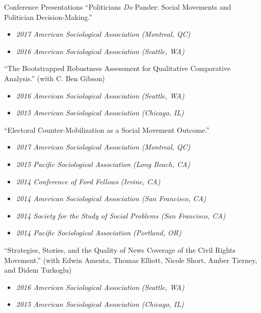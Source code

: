 \documentclass{resume} %
\begin{document}
\begin{rSection}{Conference Presentations}
``Politicians \textit{Do} Pander: Social Movements and Politician Decision-Making.''
\vspace*{-.75em} 
\begin{itemize}[leftmargin=.25in] 
\item {\footnotesize \it 2017 American Sociological Association (Montreal, QC)}\vspace*{-.75em} 
\item {\footnotesize \it 2016 American Sociological Association (Seattle, WA)}
\end{itemize} 

``The Bootstrapped Robustness Assessment for Qualitative Comparative Analysis.'' ({\footnotesize with C. Ben Gibson})
\vspace*{-.75em} 
\begin{itemize}[leftmargin=.25in] 
\item {\footnotesize \it 2016 American Sociological Association (Seattle, WA)}\vspace*{-.75em} 
\item {\footnotesize \it 2015 American Sociological Association (Chicago, IL)}
\end{itemize} 

``Electoral Counter-Mobilization as a Social Movement Outcome.''
\vspace*{-.75em} 
\begin{itemize}[leftmargin=.25in] 
\item {\footnotesize \it 2017 American Sociological Association (Montreal, QC)}\vspace*{-.75em} 
\item {\footnotesize \it 2015 Pacific Sociological Association (Long Beach, CA)}\vspace*{-.75em} 
\item {\footnotesize \it 2014 Conference of Ford Fellows (Irvine, CA)}\vspace*{-.75em} 
\item {\footnotesize \it 2014 American Sociological Association (San Francisco, CA)}\vspace*{-.75em} 
\item {\footnotesize \it 2014 Society for the Study of Social Problems (San Francisco, CA)}\vspace*{-.75em} 
\item {\footnotesize \it 2014 Pacific Sociological Association (Portland, OR)}
\end{itemize} 

``Strategies, Stories, and the Quality of News Coverage of the Civil Rights Movement.'' ({\footnotesize with Edwin Amenta, Thomas Elliott, Nicole Short, Amber Tierney, and Didem Turkoglu})
\vspace*{-.75em} 
\begin{itemize}[leftmargin=.25in] 
\item {\footnotesize \it 2016 American Sociological Association (Seattle, WA)}\vspace*{-.75em} 
\item {\footnotesize \it 2015 American Sociological Association (Chicago, IL)}
\end{itemize} 


\end{rSection}
\end{document}

